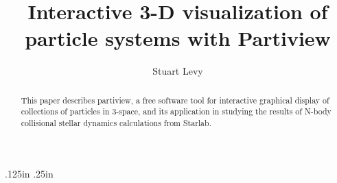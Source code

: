 %
%
%
%
%
%
%
%
%
%
%
%
\pagestyle{myheadings}
\nofiles


\def\emphasize#1{{\sl#1\/}}
\def\arg#1{{\it#1\/}}
\let\prog=\arg

\def\edcomment#1{\iffalse\marginpar{\raggedright\sl#1\/}\else\relax\fi}
\marginparwidth 1.25in
\marginparsep .125in
\marginparpush .25in
\reversemarginpar


\title{Interactive 3-D visualization of particle systems with Partiview}
 \author{Stuart Levy}

\begin{abstract}
This paper describes partiview, a free software tool for 
interactive graphical display of collections of particles
in 3-space, and its application in studying the results
of N-body collisional stellar dynamics calculations from Starlab.
\end{abstract}


